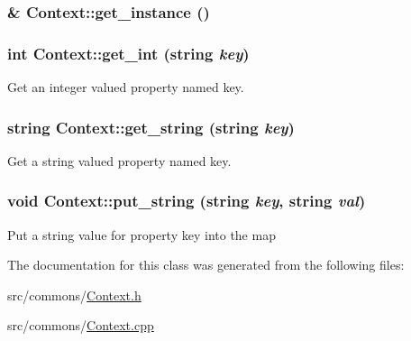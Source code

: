 \hypertarget{class_context_a021d5f8012c65a185a9b14e210eb289c}{
\subsubsection[{get\_\-instance}]{ \& Context::get\_\-instance ()}}
\label{class_context_a021d5f8012c65a185a9b14e210eb289c}
\hypertarget{class_context_a0b8f0d939e07208fe32337ace2196f24}{
\subsubsection[{get\_\-int}]{\setlength{\rightskip}{0pt plus 5cm}int Context::get\_\-int (string {\em key})}}
\label{class_context_a0b8f0d939e07208fe32337ace2196f24}


Get an integer valued property named key. 

\hypertarget{class_context_af0cb505ad6b35c252e69de53c193f6f4}{
\subsubsection[{get\_\-string}]{\setlength{\rightskip}{0pt plus 5cm}string Context::get\_\-string (string {\em key})}}
\label{class_context_af0cb505ad6b35c252e69de53c193f6f4}


Get a string valued property named key. 

\hypertarget{class_context_a324bb843de0425a28051ccc872f3bbe2}{
\subsubsection[{put\_\-string}]{\setlength{\rightskip}{0pt plus 5cm}void Context::put\_\-string (string {\em key}, \/  string {\em val})}}
\label{class_context_a324bb843de0425a28051ccc872f3bbe2}
Put a string value for property key into the map 

The documentation for this class was generated from the following files:\begin{DoxyCompactItemize}
\item 
src/commons/\hyperlink{_context_8h}{Context.h}\item 
src/commons/\hyperlink{_context_8cpp}{Context.cpp}\end{DoxyCompactItemize}
